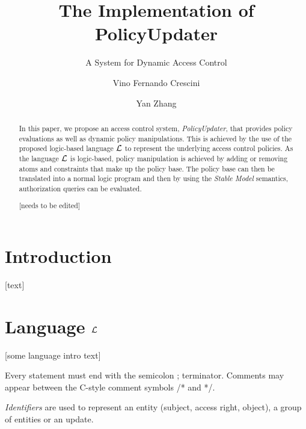 \documentclass{llncs}
\begin{document}
  \long{}

  \title{The Implementation of PolicyUpdater}
  \subtitle{A System for Dynamic Access Control}

  \author{Vino Fernando Crescini \and Yan Zhang}


  \maketitle

  \begin{abstract}
    In this paper, we propose an access control system, \emph{PolicyUpdater},
    that provides policy evaluations as well as dynamic policy manipulations.
    This is achieved by the use of the proposed logic-based language $\cal{L}$
    to represent the underlying access control policies. As the language
    $\cal{L}$ is logic-based, policy manipulation is achieved by adding or
    removing atoms and constraints that make up the policy base. The policy
    base can then be translated into a normal logic program and then by
    using the \emph{Stable Model} semantics, authorization queries can
    be evaluated.

    [needs to be edited]
  \end{abstract}

  \section{Introduction}
    [text]

  \section{Language $\cal{L}$}

    [some language intro text]

    Every statement must end with the semicolon ; terminator. Comments
    may appear between the C-style comment symbols /* and */.

    \emph{Identifiers} are used to represent an entity (subject, access
    right, object), a group of entities or an update.
\end{document}
